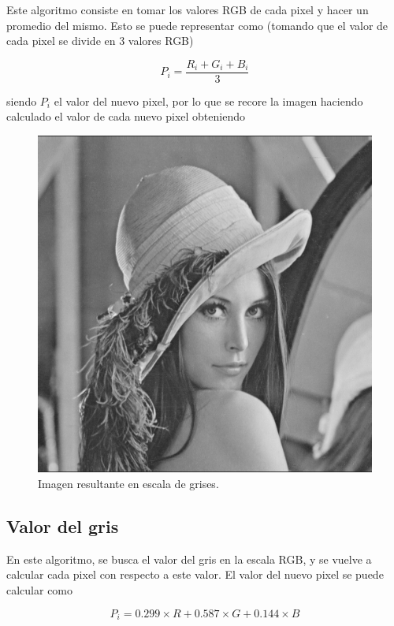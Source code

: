 Este algoritmo consiste en tomar los valores RGB de cada pixel y hacer un promedio del mismo. Esto se puede representar como (tomando que el valor de cada pixel se divide en 3 valores RGB)

\begin{equation}
	P_{i} = \frac{R_i +G_i +B_i}{3}
\end{equation}

siendo $P_i$ el valor del nuevo pixel, por lo que se recore la imagen haciendo calculado el valor de cada nuevo pixel obteniendo 

\begin{figure}[H]
	\centering
	\includegraphics[scale=0.5]{imagenes/lennaGrisRGB.png}
	\caption{Imagen resultante en escala de grises.}
\end{figure}

\subsection{Valor del gris}

En este algoritmo, se busca el valor del gris en la escala RGB, y se vuelve a calcular cada pixel con respecto a este valor. El valor del nuevo pixel se puede calcular como

\begin{equation}
	P_i = 0.299 \times R + 0.587 \times G +0.144 \times B
\end{equation}


